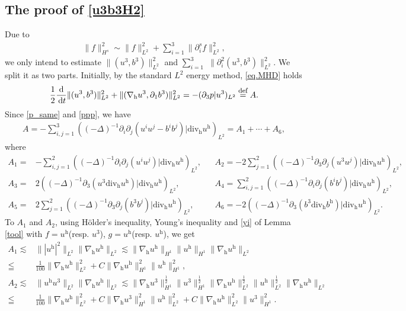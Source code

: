 \documentclass[11pt]{amsart}
\theoremstyle{definition}
\newcommand{\h}{\mathrm{h}}
\def\eqdefa{\buildrel\hbox{\footnotesize def}\over =}
\newcommand{\dt}{\,{\rm d}t}
\newcommand{\nablah}{\nabla_{\mathrm{h}}}
\numberwithin{equation}{section}
\begin{document}
\subsection{The proof of \eqref{u3b3H2}} Due to
\begin{align}\label{Hsdef}
	\|f\|_{H^{s}}^{2}\sim\|f\|_{L^2}^2+\sum_{i=1}^{3}\|\partial_{i}^sf\|_{L^2}^{2},
\end{align}
we only intend to  estimate  $\|(u^3,b^3)\|_{L^2}^2$ and $\sum_{i=1}^{3}$ $\|\partial_{i}^2(u^3,b^3)\|_{L^2}^{2}$. We split it as two parts. Initially, by the standard $L^2$ energy method, \eqref{eq.MHD}  holds
\begin{align}\label{u3b3l2}
	\frac12\frac{\mathrm{d}}{\dt}  \|(u^3,b^3)\|_{L^2}^2 +\|(\nabla_\h u^3,\partial_1 b^3)\|_{ L^2}^2=-(\partial_3 p|u^3)_{L^2}\eqdefa A.
\end{align}
Since \eqref{p_same} and \eqref{ppp}, we have
\begin{align*}
	A=-\sum_{i,j=1}^3 ((-\Delta)^{-1} \partial_i\partial_j(u^i u^j-b^i b^j) |\mathrm{div_\h}u^\h)_{L^2}=A_{1}+\cdots+A_{6},
\end{align*}
where
\begin{align*}
	A_{1}=&  -\sum_{i,j=1}^2 ((-\Delta)^{-1} \partial_i\partial_j(u^i u^j) |\mathrm{div_\h}u^\h)_{L^2}, &&
	A_{2}=  -2\sum_{j=1}^2 ((-\Delta)^{-1} \partial_3\partial_j(u^3 u^j) |\mathrm{div_\h}u^\h)_{L^2},\\
	A_{3}= & 2((-\Delta)^{-1} \partial_3(u^3 \mathrm{div_h}u^\h) |\mathrm{div_\h}u^\h)_{L^2},&&A_{4}= \sum_{i,j=1}^2 ((-\Delta)^{-1} \partial_i\partial_j(b^i b^j) |\mathrm{div_\h}u^\h)_{L^2}
	,\\
	A_{5}=&  2\sum_{j=1}^2 ((-\Delta)^{-1} \partial_3\partial_j(b^3 b^j) |\mathrm{div_\h}u^\h)_{L^2} , &&A_{6}=  -2((-\Delta)^{-1} \partial_3(b^3 \mathrm{div_h}b^\h) |\mathrm{div_\h}u^\h)_{L^2}.
\end{align*}
To $A_{1}$ and $A_{2}$, using Hölder's inequality, Young's inequality and \eqref{yi} of Lemma \ref{tool} with $f=u^\h$(resp. $u^3$), $g=u^\h$(resp. $u^\h$),  we get
\begin{align}\label{A1}
	A_{1}\lesssim&\||u^\h|^2\|_{L^2} \|\nablah u^\h\|_{L^2} \lesssim\|\nablah u^\h\|_{H^{1}}\|u^\h\|_{H^{1}}\|\nablah u^\h\|_{L^2}
	\nonumber \\
	\leqq&\frac{1}{100}\|\nablah u^\h\|_{L^2}^2+C\|\nablah u^\h\|_{H^{1}}^2\|u^\h\|_{H^1}^2,\\
	\label{A2(v)}
	A_{2}\lesssim& \|u^\h u^3\|_{L^2}\|\nablah u^\h\|_{L^2}\lesssim\|\nablah u^3\|_{H^{1}}^\frac12\|u^3\|_{H^{1}}^\frac12\|\nablah u^\h\|_{L^{2}}^\frac12\|u^\h\|_{L^{2}}^\frac12\|\nablah u^\h\|_{L^2}\nonumber\\
	\leqq&\frac{1}{100}\|\nablah u^\h\|_{L^2}^2+C\|\nablah u^3\|_{H^{1}}^2\|u^\h\|_{L^2}^2+C\|\nablah u^\h\|_{L^2}^2\|u^3\|_{H^{1}}^2.
\end{align}
\end{document}
